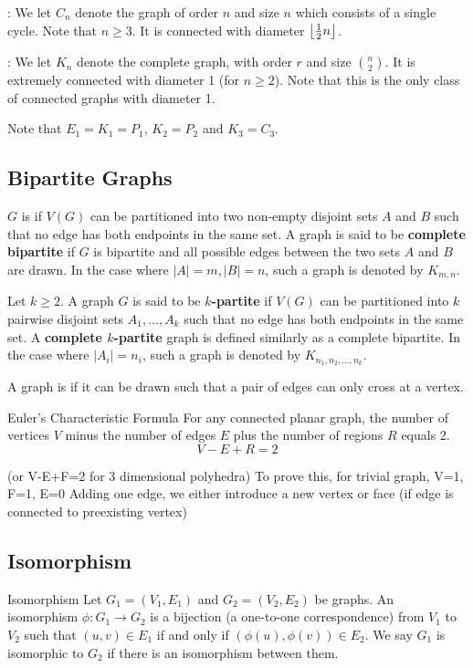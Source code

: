 : We let $C_n$ denote the graph of order $n$ and size $n$ which consists of a single
cycle. Note that $n \ge 3$. It is connected with diameter $\left\lfloor \frac{1}{2}n \right\rfloor$.

: We let $K_n$ denote the complete graph, with order $r$ and size $\binom{n}{2}$. It is extremely connected with diameter 1 (for $n \ge 2$). Note that this is the only class of connected graphs with diameter 1.

Note that $E_1 = K_1 = P_1$, $K_2 = P_2$ and $K_3 = C_3$.

\subsection{Bipartite Graphs}
$G$ is  if $V(G)$ can be partitioned into two non-empty disjoint sets $A$ and $B$ such that no edge has both endpoints in the same set. A graph is said to be \textbf{complete bipartite} if $G$ is bipartite and all possible edges between the two sets $A$ and $B$ are drawn. In the case where $|A|=m, |B|=n$, such a graph is denoted by $K_{m,n}$.

Let $k \ge 2$. A graph $G$ is said to be \textbf{$k$-partite} if $V(G)$ can be partitioned into $k$ pairwise disjoint sets $A_1, \dots, A_k$ such that no edge has both endpoints in the same set. A \textbf{complete $k$-partite} graph is defined similarly as a complete bipartite. In the case where $|A_i| = n_i$, such a graph is denoted by $K_{n_1,n_2,\dots,n_k}$.

A graph is  if it can be drawn such that a pair of edges can only cross at a vertex.

\begin{thrm}{Euler's Characteristic Formula}{}
For any connected planar graph, the number of vertices $V$ minus the number of edges $E$ plus the number of regions $R$ equals 2. 
\begin{equation} V-E+R = 2 \end{equation}
\end{thrm}

(or V-E+F=2 for 3 dimensional polyhedra)
To prove this, 
for trivial graph, V=1, F=1, E=0
Adding one edge, we either introduce a new vertex or face (if edge is connected to preexisting vertex)



\subsection{Isomorphism}
\begin{defn}{Isomorphism}{}
Let $G_1 = (V_1, E_1)$ and $G_2 = (V_2, E_2)$ be graphs. An isomorphism $\phi : G_1 \to G_2$ is a bijection (a one-to-one correspondence) from $V_1$ to $V_2$ such that $(u,v) \in E_1$ if and only if $(\phi(u),\phi(v)) \in E_2$. We say $G_1$ is isomorphic to $G_2$ if there is an isomorphism between them.
\end{defn}



